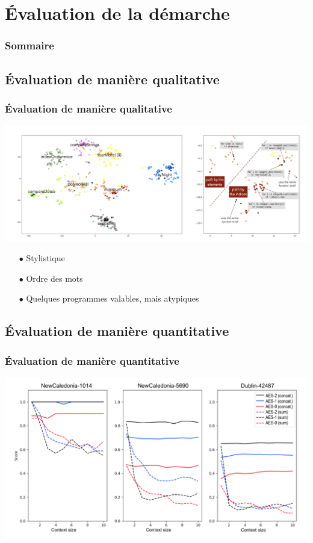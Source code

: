 \documentclass[xcolor=dvipsnames]{beamer}
\begin{document}
\section{Évaluation de la démarche}

\begin{frame}
\frametitle{Sommaire}
\tableofcontents[currentsection]
\end{frame}

\subsection{Évaluation de manière qualitative}
\begin{frame}[fragile]
\begin{center}
\frametitle{Évaluation de manière qualitative}
\includegraphics[width= \textwidth]{images/Figure_5.png}
\end{center}

\begin{itemize}
\item[$\bullet$] Stylistique

\item[$\bullet$] Ordre des mots

\item[$\bullet$] Quelques programmes valables, mais atypiques
\end{itemize}

\end{frame}


\subsection{Évaluation de manière quantitative}
\begin{frame}[fragile]
\begin{center}
\frametitle{Évaluation de manière quantitative}
\includegraphics[width= \textwidth]{images/Figure_6.png}
\end{center}
\end{frame}
\end{document}
